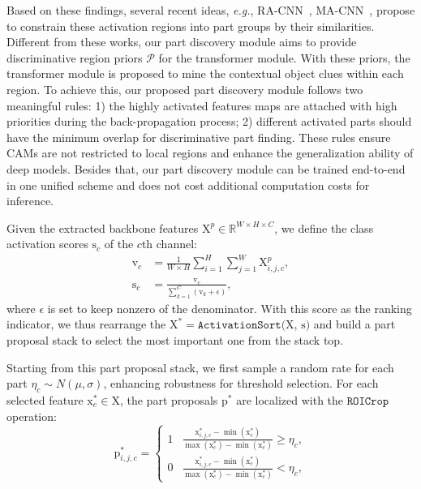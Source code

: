 \documentclass[journal]{IEEEtran}
\def\eg{{\em e.g.}}
\newcommand{\mc}[1]{\mathcal{#1}}
\newcommand{\br}[1]{\bm{\mathrm{#1}}}
\newcommand{\bs}[1]{\boldsymbol{\texttt{#1}}}
\begin{document}
Based on these findings, several recent ideas, \eg, RA-CNN~\cite{fu2017look}, MA-CNN~\cite{zheng2017learning}, propose to constrain these activation regions into part groups by their similarities. Different from these works, our part discovery module aims to provide discriminative region priors $\mc{P}$ for the transformer module. With these priors, the transformer module is proposed to mine the contextual object clues within each region. To achieve this, our proposed part discovery module follows two meaningful rules: 1) the highly activated features maps are attached with high priorities during the back-propagation process; 2) different activated parts should have the minimum overlap for discriminative part finding.  These rules ensure CAMs are not restricted to local regions and enhance the generalization ability of deep models. Besides that, our part discovery module can be trained end-to-end in one unified scheme and does not cost additional computation costs for inference.



Given the extracted backbone features $\br{X}^p \in \mathbb{R}^{W \times H \times C}$, we define the class activation scores $\br{s}_c$ of the $c$th channel:
\begin{equation}\label{eq:partscore}
\begin{split}
\br{v}_c&=\frac{1}{W\times H} \sum_{i=1}^H \sum_{j=1}^W \br{X}^{p}_{i,j,c},\\
\br{s}_c&= \frac{\br{v}_c} {\sum_{k=1}^{C}(\br{v}_k+\epsilon)},
\end{split}
\end{equation}
where $\epsilon$ is set to keep nonzero of the denominator. With this score as the ranking indicator, we thus rearrange the $\br{X}^{*}  = \bs{ActivationSort}(\br{X}$, $\br{s})$ and build a part proposal stack to select the most important one from the stack top.

Starting from this part proposal stack, we first sample a random rate for each part $\eta_c \sim  {N}(\mu,\sigma)$, enhancing robustness for threshold selection. For each selected feature $\br{x}^{*}_{c} \in \br{X}$, the part proposals $\br{p}^{*}$ are localized with the $\bs{ROICrop}$ operation:
\begin{equation}\label{eq:croppart}
\br{p}^{*}_{i,j,c} =
\left\{\begin{matrix}
 1&   \frac{\br{x}^{*}_{i,j,c}-\min (\br{x}^{*}_{c}) }{ \max(\br{x}^{*}_{c})-\min (\br{x}^{*}_{c}) } \ge \eta_c, \\
 0&   \frac{\br{x}^{*}_{i,j,c}-\min (\br{x}^{*}_{c}) }{ \max(\br{x}^{*}_{c})-\min (\br{x}^{*}_{c}) } < \eta_c,
\end{matrix}\right.
\end{equation}
\end{document}
